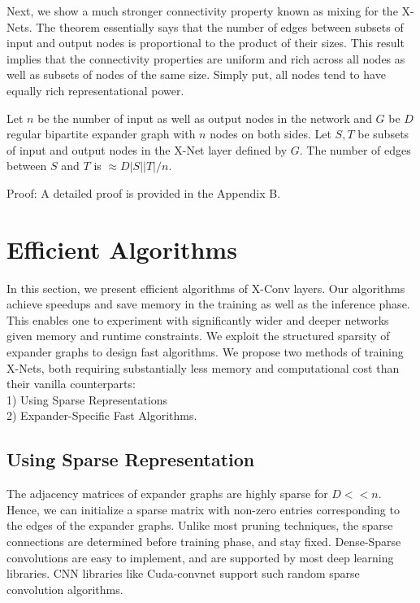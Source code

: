 \noindent Next, we show a much stronger connectivity property known as mixing for the X-Nets. The theorem essentially says that the number of edges between subsets of input and output nodes is proportional to the product of their sizes. This result implies that the connectivity properties are uniform and rich across all nodes as well as subsets of nodes of the same size. Simply put, all nodes tend to have equally rich representational power.\\ 

\begin{theorem}
Let $n$ be the number of input as well as output nodes in the network and $G$ be $D$ regular bipartite expander graph with $n$ nodes on both sides. Let $S,T$ be subsets of input and output nodes in the X-Net layer defined by $G$. The number of edges between $S$ and $T$ is $\approx D|S||T|/n$.

Proof: A detailed proof is provided in the Appendix B.
\end{theorem}

\section{Efficient Algorithms}\label{sec:implementation}
 
\noindent In this section, we present efficient algorithms of X-Conv layers. Our algorithms achieve speedups and save memory in the training as well as the inference phase. This enables one to experiment with significantly wider and deeper networks given  memory and runtime constraints.
We exploit the structured sparsity of expander graphs to design fast algorithms.  We propose two methods of training X-Nets, both requiring substantially less memory and computational cost than their vanilla counterparts: \\1) Using Sparse Representations \\2) Expander-Specific Fast Algorithms.

\subsection{Using Sparse Representation}

\noindent The adjacency matrices of expander graphs are highly sparse for $D << n$. Hence, we can initialize a sparse matrix with non-zero entries corresponding to the edges of the expander graphs. Unlike most pruning techniques, the sparse connections are determined before training phase, and stay fixed. Dense-Sparse convolutions are easy to implement, and are supported by most deep learning libraries. CNN libraries like Cuda-convnet\cite{cudaconvnet} support such random sparse convolution algorithms.

